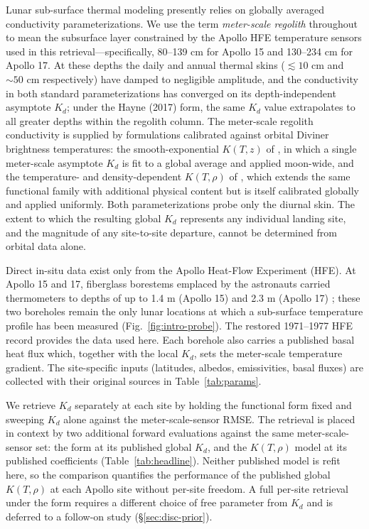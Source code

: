 \documentclass[11pt]{article}
\begin{document}
Lunar sub-surface thermal modeling presently relies on globally averaged
conductivity parameterizations. We use the term
\emph{meter-scale regolith} throughout to mean
the subsurface layer constrained by the
Apollo HFE temperature sensors used in this retrieval---specifically,
80--139 cm for Apollo 15 and 130--234 cm for Apollo 17. At these depths the
daily and annual thermal skins ($\lesssim 10$ cm and $\sim 50$ cm
respectively) have damped to negligible amplitude, and the conductivity in
both standard parameterizations has
converged on its depth-independent asymptote
$K_d$; under the Hayne (2017) form, the same $K_d$ value
extrapolates to all greater depths within the regolith column. The meter-scale regolith conductivity is supplied by formulations
calibrated against orbital Diviner brightness temperatures: the
smooth-exponential $K(T,z)$ of \citet{hayne2017}, in which a single
meter-scale asymptote $K_d$ is fit to a global
average and applied moon-wide, and the temperature- and density-dependent
$K(T,\rho)$ of \citet{martinez2021}, which extends the same functional
family with additional physical content but is itself calibrated globally
and applied uniformly. Both parameterizations probe only the diurnal skin.
The extent to which the resulting global $K_d$ represents any individual
landing site, and the magnitude of any site-to-site departure, cannot be
determined from orbital data alone.

Direct in-situ data exist only from the Apollo Heat-Flow Experiment (HFE).
At Apollo 15 and 17, fiberglass borestems emplaced by the astronauts
carried thermometers to depths of up to 1.4 m (Apollo 15) and 2.3 m
(Apollo 17) \citep{langseth1972,langseth1976}; these two boreholes remain the only
lunar locations at which a sub-surface temperature profile has been
measured (Fig.~\ref{fig:intro-probe}). The restored 1971--1977 HFE record
\citep{nagihara2018} provides the data used here. Each borehole also
carries a published basal heat flux \citep{langseth1976,nagihara2018}
which, together with the local $K_d$, sets the
meter-scale temperature gradient. The site-specific inputs
(latitudes, albedos, emissivities, basal fluxes) are collected with their
original sources in Table~\ref{tab:params}.

We retrieve $K_d$ separately at each site by holding the \citet{hayne2017}
functional form fixed and sweeping $K_d$ alone against the
meter-scale-sensor RMSE. The retrieval is placed in
context by two additional forward evaluations against the same
meter-scale-sensor set: the \citet{hayne2017} form
at its published global $K_d$, and the \citet{martinez2021} $K(T,\rho)$
model at its published coefficients (Table~\ref{tab:headline}). Neither
published model is refit here, so the \citet{martinez2021} comparison
quantifies the performance of the published global $K(T,\rho)$ at each
Apollo site without per-site freedom. A full per-site retrieval under the
\citet{martinez2021} form requires a different choice of free parameter from
$K_d$ and is deferred to a follow-on study (\S\ref{sec:disc-prior}).
\end{document}
